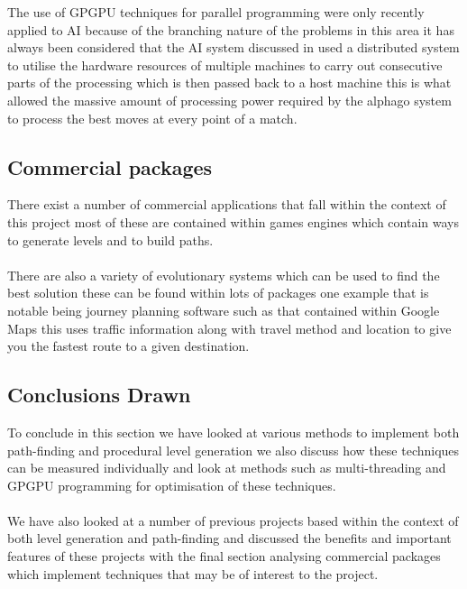 The use of GPGPU techniques for parallel programming were only recently applied to AI because of the branching nature of the problems in this area it has always been considered that  the AI system discussed in \cite{AI-learning} used a distributed system to utilise the hardware resources of multiple machines to carry out consecutive parts of the processing which is then passed back to a host machine this is what allowed the massive amount of processing power required by the alphago system to process the best moves at every point of a match. 

\subsection{Commercial packages}
There exist a number of commercial applications that fall within the context of this project most of these are contained within  games engines which contain ways to generate levels and to build paths.\\\\ There are also a variety of evolutionary systems which can be used to find the best solution these can be found within lots of packages one example that is notable being journey planning software such as that contained within Google Maps this uses traffic information along with travel method and location to give you the fastest route to a given destination. 

\subsection{Conclusions Drawn}
To conclude in this section we have looked at various methods to implement both path-finding and procedural level generation we also discuss how these techniques can be measured individually and look at methods such as multi-threading and GPGPU programming for optimisation of these techniques.\\\\We have also looked at a number of previous projects based within the context of both level generation and path-finding and discussed the benefits and important features of these projects with the final section analysing commercial packages which implement techniques that may be of interest to the project.  
\pagebreak

